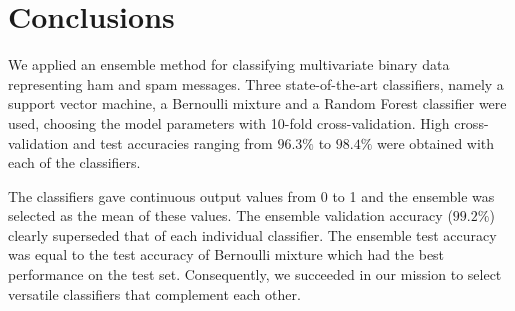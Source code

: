\section{Conclusions}

We applied an ensemble method for classifying multivariate binary data
representing ham and spam messages. Three state-of-the-art classifiers,
namely a support vector machine, a Bernoulli mixture and a Random Forest
classifier were used, choosing the model parameters with 10-fold
cross-validation. High cross-validation and test accuracies ranging from
$96.3 \%$ to $98.4 \%$ were obtained with each of the classifiers.

The classifiers gave continuous output values from 0 to 1 and the
ensemble was selected as the mean of these values. The ensemble
validation accuracy ($99.2 \%$) clearly superseded that of each
individual classifier. The ensemble test accuracy was equal to the test
accuracy of Bernoulli mixture which had the best performance on the test
set. Consequently, we succeeded in our mission to select versatile
classifiers that complement each other.
